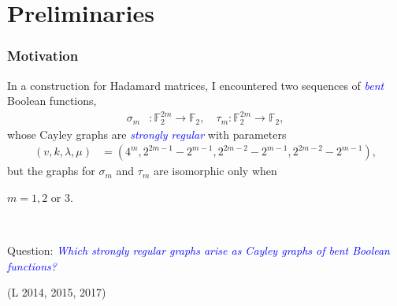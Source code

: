 \documentclass[pdf,sprung,slideColor,nocolorBG]{beamer}
\newenvironment{colortheme}[1]{
\def\ProvidesPackageRCS $##1${\relax}
\renewcommand{\ProcessOptions}{\relax}
\makeatletter

\makeatother
}{}
\newcommand{\slidecite}[1]{\tiny{(#1)}\normalsize{}}
\newcommand{\mb}[1]{\mathbb{#1}}
\newcommand{\Emph}[1]{\emph{\textcolor{blue}{#1}}}
\newcommand{\To}{\rightarrow}
\newcommand{\F}{\mb{F}}
\begin{document}
\section{Preliminaries}

\begin{colortheme}{jubata}

\begin{frame}
\frametitle{Motivation}

In a construction for Hada\-mard matrices, I encountered
two sequences of \Emph{bent} Boolean functions,
\begin{align*}
\sigma_m &: \F_2^{2m} \To \F_2, \quad \tau_m : \F_2^{2m} \To \F_2,
\end{align*}
whose Cayley graphs are \Emph{strongly regular} with parameters
\begin{align*}
(v,k,\lambda,\mu) &= (4^m, 2^{2 m - 1} - 2^{m-1}, 2^{2 m - 2} - 2^{m-1}, 2^{2 m - 2} - 2^{m-1}),
\end{align*}
but the graphs for $\sigma_m$ and $\tau_m$ are isomorphic only when

$m=1,2$ or $3.$

~

Question: \Emph{Which strongly regular graphs arise as Cayley graphs of bent Boolean functions?}

\slidecite{L 2014, 2015, 2017}
\end{frame}
\end{colortheme}
\end{document}
